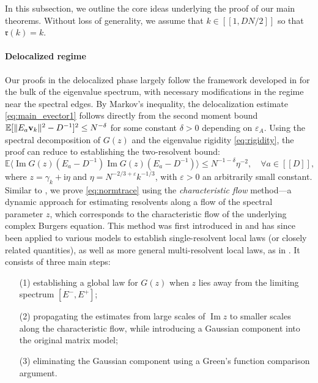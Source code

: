 \documentclass[10pt,reqno]{amsart}
\numberwithin{equation}{section}
\numberwithin{figure}{section}
\theoremstyle{plain} %
\theoremstyle{definition} %
\newcommand{\E}{\mathbb{E}}
\newcommand{\fr}{{\mathfrak{r}}}
\newcommand{\ii}{\mathrm{i}}
\newcommand{\qq}[1]{[\![{#1}]\!]}
\newcommand{\pa}[1]{\left({#1}\right)}
\newcommand{\avg}[1]{\langle #1 \rangle}
\DeclareMathOperator{\im}{\mathrm{Im}}
\newcommand{\bv}{{\bf{v}}}
\newcommand{\be}{\begin{equation}}
\newcommand{\ee}{\end{equation}}
\newcommand{\e}{{\varepsilon}}
\numberwithin{equation}{section}
\begin{document}
In this subsection, we outline the core ideas underlying the proof of our main theorems. Without loss of generality, we assume that $k\in\qq{1,DN/2}$ so that  $\fr\pa{k}=k$.

\medskip

\paragraph{\bf Delocalized regime}
 

Our proofs in the delocalized phase largely follow the framework developed in \cite{stone2024randommatrixmodelquantum} for the bulk of the eigenvalue spectrum, with necessary modifications in the regime near the spectral edges. By Markov's inequality, the delocalization estimate \eqref{eq:main_evector1} follows directly from the second moment bound $\E[\|E_a \bv_k\|^2-D^{-1}]^2\le N^{-\delta}$ for some constant $\delta>0$ depending on $\varepsilon_A$.
Using the spectral decomposition of $G(z)$ and the eigenvalue rigidity \eqref{eq:rigidity}, the proof can reduce to establishing the two-resolvent bound:
\be\label{eq:normtrace}
\E \avg{\im G(z) (E_a -D^{-1}) \im G(z) (E_a -D^{-1})} \le N^{-1-\delta}\eta^{-2}, \quad \forall a\in \qq D, 
\ee
where $z=\gamma_k+\ii\eta$ and $\eta=N^{-2/3+\varepsilon}k^{-1/3}$, with $\e>0$ an arbitrarily small constant.  
Similar to \cite{stone2024randommatrixmodelquantum}, we prove \eqref{eq:normtrace} using the \emph{characteristic flow} method---a dynamic approach for estimating resolvents along a flow of the spectral parameter $z$, which corresponds to the characteristic flow of the underlying complex Burgers equation.  
This method was first introduced in \cite{lee2015edge} and has since been applied to various models \cite{HL2019_PTRF,Landon2024_PTRF,Adhikari2020_PTRF,Adhikari2023_PTRF,LS_2022,Bourgade_JEMS} to establish single-resolvent local laws (or closely related quantities), as well as more general multi-resolvent local laws, as in  \cite{BF_LQG,CEH2023,CEX2023,CGLJ2024_AJMP,erdHos2024eigenstate,cipolloni2024mesoscopic,campbell2024spectraledgenonhermitianrandom,erdos2024cuspuniversalitycorrelatedrandom}. 
It consists of three main steps:
\begin{enumerate}
\item[(1)] establishing a global law for $G(z)$ when $z$ lies away from the limiting spectrum $[E^-,E^+]$;

\item[(2)] propagating the estimates from large scales of $\im z$ to smaller scales along the characteristic flow, while introducing a Gaussian component into the original matrix model;

\item[(3)] eliminating the Gaussian component using a Green's function comparison argument.
\end{enumerate}
\end{document}
